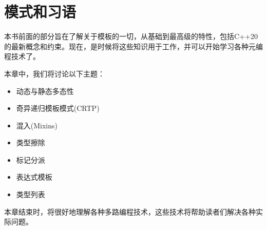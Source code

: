 \chapter{模式和习语}

本书前面的部分旨在了解关于模板的一切，从基础到最高级的特性，包括C++20的最新概念和约束。现在，是时候将这些知识用于工作，并可以开始学习各种元编程技术了。

本章中，我们将讨论以下主题：

\begin{itemize}
  \item 动态与静态多态性
  \item 奇异递归模板模式(CRTP)
  \item 混入(Mixins)
  \item 类型擦除
  \item 标记分派
  \item 表达式模板
  \item 类型列表
\end{itemize}

本章结束时，将很好地理解各种多路编程技术，这些技术将帮助读者们解决各种实际问题。









